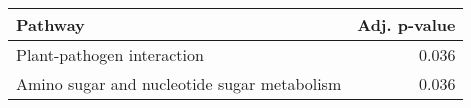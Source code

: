 \begin{tabular}{lr}
\toprule
                                     Pathway &  Adj. p-value \\
\midrule
                  Plant-pathogen interaction &         0.036 \\
 Amino sugar and nucleotide sugar metabolism &         0.036 \\
\bottomrule
\end{tabular}
